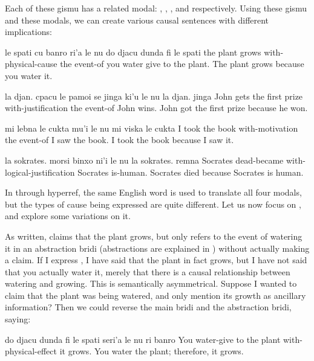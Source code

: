 Each of these gismu has a related modal: , ,
    , and  respectively. Using these gismu and
    these modals, we can create various causal sentences with
    different implications:
\begin{example}
le spati cu banro\n
\T	ri'a le nu\n
\T	do djacu dunda fi le spati\n
the plant grows\n
\T	with-physical-cause the event-of\n
\T	you water give to the plant.\n
The plant grows because you water it.
\end{example}

\begin{example}
la djan. cpacu le pamoi se jinga\n
\T	ki'u le nu la djan. jinga\n
John gets the first prize\n
\T	with-justification the event-of John wins.\n
John got the first prize because he won.
\end{example}

\begin{example}
mi lebna le cukta\n
\T	mu'i le nu mi viska le cukta\n
I took the book\n
\T	with-motivation the event-of I saw the book.\n
I took the book because I saw it.
\end{example}

\begin{example}
la sokrates. morsi binxo\n
\T	ni'i le nu la sokrates. remna\n
Socrates dead-became\n
\T	with-logical-justification Socrates is-human.\n
Socrates died because Socrates is human.
\end{example}

In  through hyperref, the same English word  is used
    to translate all four modals, but the types of cause being
    expressed are quite different. Let us now focus on , and explore some variations on
    it. 

As written,  claims that the
    plant grows, but only refers to the event of watering it in an
    abstraction bridi (abstractions are explained in ) without actually making a
    claim. If I express , I have
    said that the plant in fact grows, but I have not said that you
    actually water it, merely that there is a causal relationship
    between watering and growing. This is semantically
    asymmetrical. Suppose I wanted to claim that the plant was
    being watered, and only mention its growth as ancillary
    information? Then we could reverse the main bridi and the
    abstraction bridi, saying:
\begin{example}
do djacu dunda fi le spati\n
\T	seri'a le nu ri banro\n
You water-give to the plant\n
\T	with-physical-effect it grows.\n
You water the plant; therefore, it grows.
\end{example}

